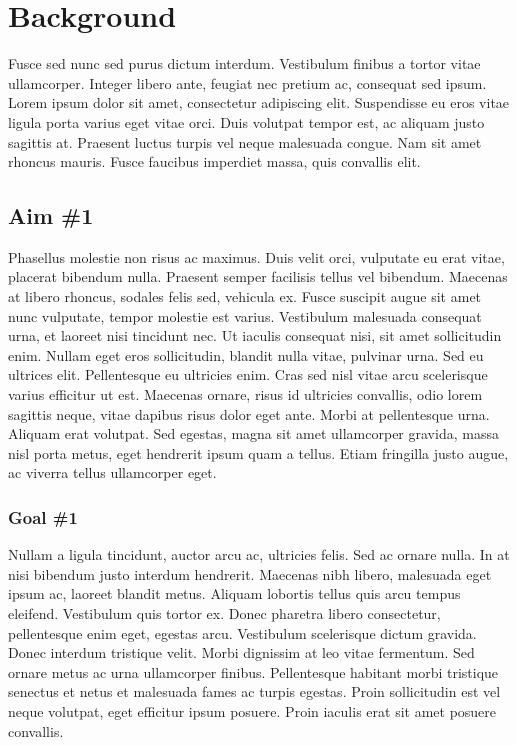 \section{Background}
Fusce sed nunc sed purus dictum interdum. Vestibulum finibus a tortor vitae ullamcorper. Integer libero ante, feugiat nec pretium ac, consequat sed ipsum. Lorem ipsum dolor sit amet, consectetur adipiscing elit. Suspendisse eu eros vitae ligula porta varius eget vitae orci. Duis volutpat tempor est, ac aliquam justo sagittis at. Praesent luctus turpis vel neque malesuada congue. Nam sit amet rhoncus mauris. Fusce faucibus imperdiet massa, quis convallis elit.

\subsection{Aim \#1}
Phasellus molestie non risus ac maximus. Duis velit orci, vulputate eu erat vitae, placerat bibendum nulla. Praesent semper facilisis tellus vel bibendum. Maecenas at libero rhoncus, sodales felis sed, vehicula ex. Fusce suscipit augue sit amet nunc vulputate, tempor molestie est varius. Vestibulum malesuada consequat urna, et laoreet nisi tincidunt nec. Ut iaculis consequat nisi, sit amet sollicitudin enim. Nullam eget eros sollicitudin, blandit nulla vitae, pulvinar urna. Sed eu ultrices elit. Pellentesque eu ultricies enim. Cras sed nisl vitae arcu scelerisque varius efficitur ut est. Maecenas ornare, risus id ultricies convallis, odio lorem sagittis neque, vitae dapibus risus dolor eget ante. Morbi at pellentesque urna. Aliquam erat volutpat. Sed egestas, magna sit amet ullamcorper gravida, massa nisl porta metus, eget hendrerit ipsum quam a tellus. Etiam fringilla justo augue, ac viverra tellus ullamcorper eget.

	\subsubsection{Goal \#1}
	Nullam a ligula tincidunt, auctor arcu ac, ultricies felis. Sed ac ornare nulla. In at nisi bibendum justo interdum hendrerit. Maecenas nibh libero, malesuada eget ipsum ac, laoreet blandit metus. Aliquam lobortis tellus quis arcu tempus eleifend. Vestibulum quis tortor ex. Donec pharetra libero consectetur, pellentesque enim eget, egestas arcu. Vestibulum scelerisque dictum gravida. Donec interdum tristique velit. Morbi dignissim at leo vitae fermentum. Sed ornare metus ac urna ullamcorper finibus. Pellentesque habitant morbi tristique senectus et netus et malesuada fames ac turpis egestas. Proin sollicitudin est vel neque volutpat, eget efficitur ipsum posuere. Proin iaculis erat sit amet posuere convallis.

